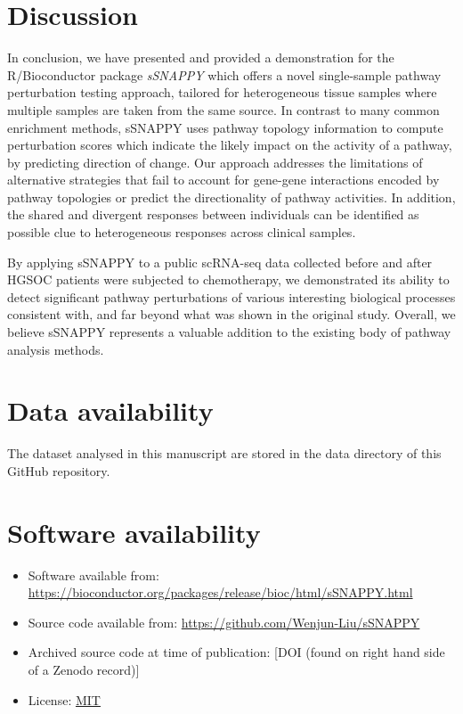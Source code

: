 \documentclass[9pt,a4paper,]{extarticle}
\begin{document}
\hypertarget{discussion}{%
\section{Discussion}\label{discussion}}

In conclusion, we have presented and provided a demonstration for the R/Bioconductor package \emph{sSNAPPY} which offers a novel single-sample pathway perturbation testing approach, tailored for heterogeneous tissue samples where multiple samples are taken from the same source.
In contrast to many common enrichment methods, sSNAPPY uses pathway topology information to compute perturbation scores which indicate the likely impact on the activity of a pathway, by predicting direction of change.
Our approach addresses the limitations of alternative strategies that fail to account for gene-gene interactions encoded by pathway topologies or predict the directionality of pathway activities.
In addition, the shared and divergent responses between individuals can be identified as possible clue to heterogeneous responses across clinical samples.

By applying sSNAPPY to a public scRNA-seq data collected before and after HGSOC patients were subjected to chemotherapy, we demonstrated its ability to detect significant pathway perturbations of various interesting biological processes consistent with, and far beyond what was shown in the original study.
Overall, we believe sSNAPPY represents a valuable addition to the existing body of pathway analysis methods.

\hypertarget{data-availability}{%
\section{Data availability}\label{data-availability}}

The dataset analysed in this manuscript are stored in the data directory of this GitHub repository.

\hypertarget{software-availability}{%
\section{Software availability}\label{software-availability}}

\begin{itemize}
\item
  Software available from: \url{https://bioconductor.org/packages/release/bioc/html/sSNAPPY.html}
\item
  Source code available from: \url{https://github.com/Wenjun-Liu/sSNAPPY}
\item
  Archived source code at time of publication: {[}DOI (found on right hand side of a Zenodo record){]}
\item
  License: \href{https://opensource.org/license/mit/}{MIT}
\end{itemize}
\end{document}
